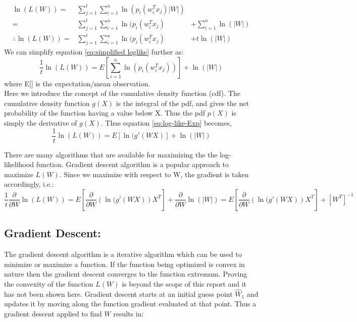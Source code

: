 \documentclass[journal,onecolumn,12pt]{IEEEtran}
\begin{document}
\begin{eqnarray}
    \ln{(L(W))} =& \sum_{j=1}^t\sum_{i=1}^n\ln{(p_i(w_i^Tx_j)|W|)}&\\
     =& \sum_{j=1}^t\sum_{i=1}^n\ln{(p_i(w_i^Tx_j)}& + \sum_{i=1}^n\ln(|W|)\\
     \therefore \ln{(L(W))} =& \sum_{j=1}^t\sum_{i=1}^n\ln{(p_i(w_i^Tx_j)}& + t\ln{(|W|)}
     \label{eq:simplified loglike}
\end{eqnarray}
We can simplify equation \ref{eq:simplified loglike} further as:
\begin{equation}
    \frac{1}{t}\ln{(L(W))} = E\left[\sum_{i=1}^n\ln{(p_i(w_i^Tx_j))}\right] + \ln{(|W|)}
    \label{eq:log-like-Exp}
\end{equation}
where E[] is the expectation/mean observation. \\
Here we introduce the concept of the cumulative density function (cdf). The cumulative density function $g(X)$ is the integral of the pdf, and gives the net probability of the function having a value below X. Thus the pdf $p(X)$ is simply the derivative of $g(X)$. Thus equation \ref{eq:log-like-Exp} becomes,\\
\begin{equation}
    \frac{1}{t}\ln{(L(W))} = E\left[\ln{(g'(WX)}\right] + \ln{(|W|)}
    \label{eq:log-like-Exp-cdf} 
\end{equation}

There are many algorithms that are available for maximizing the the log-likelihood function. Gradient descent algorithm is a popular approach to maximize $L(W)$. Since we maximize with respect to W, the gradient is taken accordingly, i.e.:
\begin{equation}
    \frac{1}{t}\frac{\partial}{\partial W}\ln(L(W)) = E\left[\frac{\partial}{\partial W}(\ln{(g'(WX)})X^T\right] + \frac{\partial}{\partial W}\ln{(|W|)} = E\left[\frac{\partial}{\partial W}(\ln{(g'(WX)})X^T\right] + \left[W^T\right]^{-1}
\end{equation}
\subsection{Gradient Descent:}
The gradient descent algorithm is a iterative algorithm which can be used to minimize or maximize a function. If the function being optimized is convex in nature then the gradient descent converges to the function extremum. Proving the convexity of the function $L(W)$ is beyond the scope of this report and it has not been shown here. Gradient descent starts at an initial guess point $\hat{W}_1$ and updates it by moving along the function gradient evaluated at that point. Thus a gradient descent applied to find $W$ results in:
\end{document}
